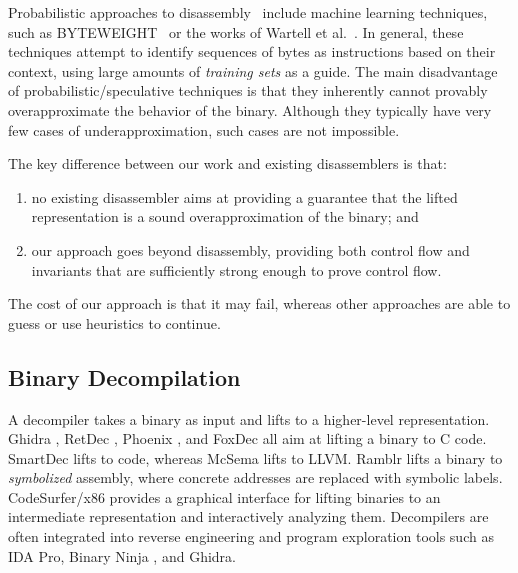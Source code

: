Probabilistic approaches to disassembly~\cite{khadra2016speculative,miller2019probabilistic} include machine learning techniques, such as BYTEWEIGHT~\cite{bao2014byteweight} or the works of Wartell et al.~\cite{wartell2011differentiating,wartell2014shingled}.
In general, these techniques attempt to identify sequences of bytes as instructions
based on their context, using large amounts of \emph{training sets} as a guide.
The main disadvantage of probabilistic/speculative techniques is that they inherently cannot provably overapproximate the behavior of the binary.
Although they typically have very few cases of underapproximation, such cases are not impossible.

The key difference between our work and existing disassemblers is that:
\begin{enumerate}
  \item no existing disassembler aims at providing a guarantee that the lifted representation is a sound overapproximation of the binary; and
  \item our approach goes beyond disassembly, providing both control flow and invariants that are sufficiently strong enough to prove control flow.
\end{enumerate}
The cost of our approach is that it may fail, whereas other approaches are able to guess or use heuristics to continue.

\subsection{Binary Decompilation}
A decompiler takes a binary as input and lifts to a higher-level representation.
Ghidra \autocite{ghidra}, RetDec \autocite{retdec}, Phoenix \autocite{brumley2013native}, and FoxDec \autocite{verbeek2020sound} all aim at lifting a binary to C code.
SmartDec \autocite{fokin2011smartdec} lifts to \Cpp{} code, whereas McSema \autocite{dinaburg2014mcsema} lifts to LLVM.
Ramblr \autocite{wang2017ramblr} lifts a binary to \emph{symbolized} assembly, where concrete addresses are replaced with symbolic labels.
CodeSurfer/x86 \autocite{balakrishnan2004analyzing,balakrishnan2005codesurfer}
provides a graphical interface for lifting binaries
to an intermediate representation
and interactively analyzing them.
Decompilers are often integrated into reverse engineering
and program exploration tools
such as IDA Pro, %
Binary Ninja \autocite{binary-ninja-decompiler}, and Ghidra.

